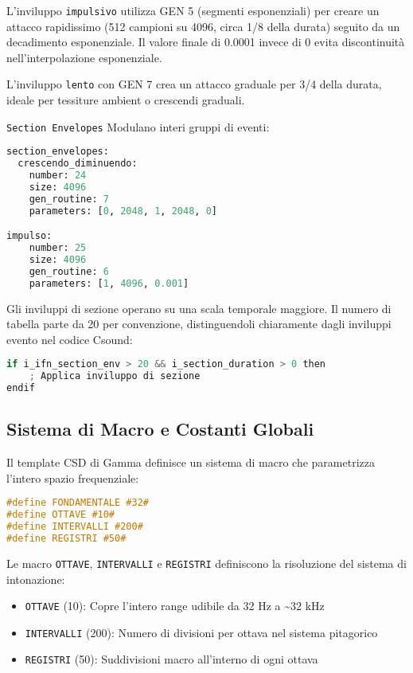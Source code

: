 L'inviluppo \texttt{impulsivo} utilizza GEN 5 (segmenti esponenziali) per creare un attacco rapidissimo (512 campioni su 4096, circa 1/8 della durata) seguito da un decadimento esponenziale. Il valore finale di 0.0001 invece di 0 evita discontinuità nell'interpolazione esponenziale.

L'inviluppo \texttt{lento} con GEN 7 crea un attacco graduale per 3/4 della durata, ideale per tessiture ambient o crescendi graduali.

\texttt{Section Envelopes} Modulano interi gruppi di eventi:

\begin{lstlisting}[language=Python]
section_envelopes:
  crescendo_diminuendo:
    number: 24
    size: 4096
    gen_routine: 7
    parameters: [0, 2048, 1, 2048, 0]

impulso:
    number: 25
    size: 4096
    gen_routine: 6
    parameters: [1, 4096, 0.001]
\end{lstlisting}

Gli inviluppi di sezione operano su una scala temporale maggiore. Il numero di tabella parte da 20 per convenzione, distinguendoli chiaramente dagli inviluppi evento nel codice Csound:

\begin{lstlisting}[language=C]
if i_ifn_section_env > 20 && i_section_duration > 0 then
    ; Applica inviluppo di sezione
endif
\end{lstlisting}
\subsection{Sistema di Macro e Costanti Globali}
Il template CSD di Gamma definisce un sistema di macro che parametrizza l'intero spazio frequenziale:

\begin{lstlisting}[language=C]
#define FONDAMENTALE #32#
#define OTTAVE #10#
#define INTERVALLI #200#
#define REGISTRI #50#
\end{lstlisting}

Le macro \texttt{OTTAVE}, \texttt{INTERVALLI} e \texttt{REGISTRI} definiscono la risoluzione del sistema di intonazione:

\begin{itemize}
 \item \texttt{OTTAVE} (10): Copre l'intero range udibile da 32 Hz a \textasciitilde{}32 kHz
 \item \texttt{INTERVALLI} (200): Numero di divisioni per ottava nel sistema pitagorico
 \item \texttt{REGISTRI} (50): Suddivisioni macro all'interno di ogni ottava
\end{itemize}

